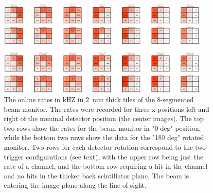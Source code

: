 \begin{refsection}
        \begin{figure}
            \centering
            \includegraphics[width=0.95\textwidth]{Figures/muEDM_Dec2023/BeamMonRect_scanData2023.png}%
            \caption{The online rates in kHZ in 2~mm thick tiles of the 8-segmented beam monitor. The rates were recorded for three x-positions left and right of the nominal detector position (the center images). The top two rows show the rates for the beam monitor in "0 deg" position, while the bottom two rows show the data for the "180 deg" rotated monitor. Two rows for each detector rotation correspond to the two trigger configurations (see text), with the upper row being just the rate of a channel, and the bottom row requiring a hit in the channel and no hits in the thicker back scintillator plane. The beam is entering the image plane along the line of sight.}
            \label{fig:BeamMonRect_positionScan}
        \end{figure}
        

\end{refsection}
